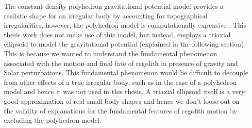 %
\newline\newline
%
The constant density polyhedron gravitational potential model provides a realistic shape for an irregular body by accounting for topographical irregularities, however, the polyhedron model is computationally expensive \parencite{scheeresBook}. This thesis work does not make use of this model, but instead, employs a triaxial ellipsoid to model the gravitational potential (explained in the following section). This is because we wanted to understand the fundamental phenomenon associated with the motion and final fate of regolith in presence of gravity and Solar perturbations. This fundamental phenomenon would be difficult to decouple from other effects of a true irregular body, such as in the case of a polyhedron model and hence it was not used in this thesis. A triaxial ellipsoid itself is a very good approximation of real small body shapes \parencite{broschart2005control} and hence we don't loose out on the validity of explanations for the fundamental features of regolith motion by excluding the polyhedron model.

